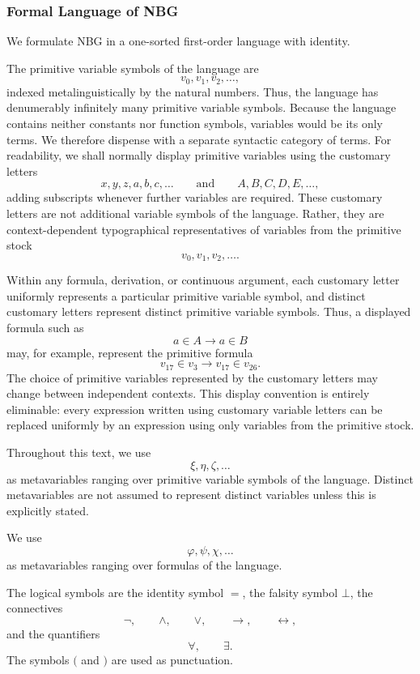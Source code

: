 \subsubsection*{Formal Language of NBG}

We formulate NBG in a one-sorted first-order language with identity.

The primitive variable symbols of the language are
\[
v_0,v_1,v_2,\ldots,
\]
indexed metalinguistically by the natural numbers. Thus, the language has denumerably infinitely many primitive variable symbols. Because the language contains neither constants nor function symbols, variables would be its only terms. We therefore dispense with a separate syntactic category of terms.
For readability, we shall normally display primitive variables using the customary letters
\[
x,y,z,a,b,c,\ldots
\qquad\text{and}\qquad
A,B,C,D,E,\ldots,
\]
adding subscripts whenever further variables are required. These customary letters are not additional variable symbols of the language. Rather, they are context-dependent typographical representatives of variables from the primitive stock
\[
v_0,v_1,v_2,\ldots.
\]

Within any formula, derivation, or continuous argument, each customary letter uniformly represents a particular primitive variable symbol, and distinct customary letters represent distinct primitive variable symbols. Thus, a displayed formula such as
\[
a\in A\to a\in B
\]
may, for example, represent the primitive formula
\[
v_{17}\in v_3\to v_{17}\in v_{26}.
\]
The choice of primitive variables represented by the customary letters may change between independent contexts. This display convention is entirely eliminable: every expression written using customary variable letters can be replaced uniformly by an expression using only variables from the primitive stock. 

Throughout this text, we use
\[
\xi,\eta,\zeta,\ldots
\]
as metavariables ranging over primitive variable symbols of the language. Distinct metavariables are not assumed to represent distinct variables unless this is explicitly stated.

We use
\[
\varphi,\psi,\chi,\ldots
\]
as metavariables ranging over formulas of the language.

The logical symbols are the identity symbol \(=\), the falsity symbol \(\bot\), the connectives
\[
\neg,\qquad
\land,\qquad
\lor,\qquad
\to,\qquad
\leftrightarrow,
\]
and the quantifiers
\[
\forall,\qquad
\exists.
\]
The symbols \(\lparen\) and \(\rparen\) are used as punctuation.

